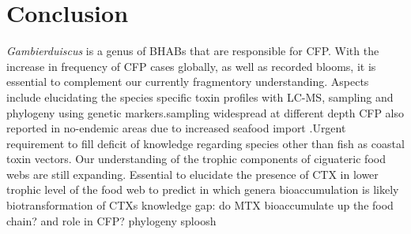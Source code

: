 \documentclass[12pt]{article}
\begin{document}



\section{Conclusion}
\emph{Gambierduiscus} is a genus of BHABs that are responsible for CFP. With the increase in frequency of CFP cases globally, as well as recorded blooms, it is essential to complement our currently fragmentory understanding. Aspects include elucidating the species specific toxin profiles with LC-MS, sampling and phylogeny using genetic markers.sampling widespread at different depth 
CFP also reported in no-endemic areas due to increased seafood import \cite{glaziou1994epidemiology,ting2001ciguatera}.Urgent requirement to fill deficit of knowledge regarding species other than fish as coastal toxin vectors. 
Our understanding of the trophic components of ciguateric food webs are still expanding.
Essential to elucidate the presence of CTX in lower trophic level of the food web to predict in which genera bioaccumulation is likely \cite{mak2013pacific}
biotransformation of CTXs
knowledge gap: do MTX bioaccumulate up the food chain? and role in CFP?
phylogeny sploosh

\newpage



\end{document}
